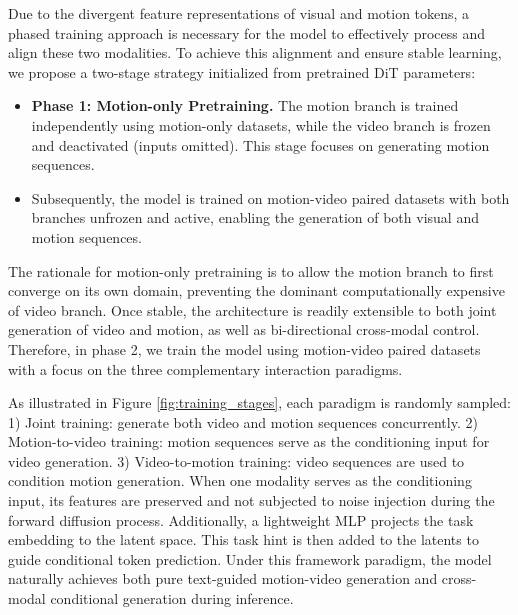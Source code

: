 Due to the divergent feature representations of visual and motion tokens, a phased training approach is necessary for the model to effectively process and align these two modalities. To achieve this alignment and ensure stable learning, we propose a two-stage strategy initialized from pretrained DiT parameters:
\begin{itemize}
\item \textbf{Phase 1: Motion-only Pretraining.} The motion branch is trained independently using motion-only datasets, while the video branch is frozen and deactivated (inputs omitted). This stage focuses on generating motion sequences.
\item \textbf{} Subsequently, the model is trained on motion-video paired datasets with both branches unfrozen and active, enabling the generation of both visual and motion sequences.
\end{itemize}
The rationale for motion-only pretraining is to allow the motion branch to first converge on its own domain, preventing the dominant computationally expensive of video branch. 
Once stable, the architecture is readily extensible to both joint generation of video and motion, as well as bi-directional cross-modal control. Therefore, in phase 2, we train the model using motion-video paired datasets with a focus on the three complementary interaction paradigms. 


As illustrated in Figure \ref{fig:training_stages}, each paradigm is randomly sampled: 1) Joint training: generate both video and motion sequences concurrently. 2) Motion-to-video training: motion sequences serve as the conditioning input for video generation. 3) Video-to-motion training: video sequences are used to condition motion generation. When one modality serves as the conditioning input, its features are preserved and not subjected to noise injection during the forward diffusion process. Additionally, a lightweight MLP projects the task embedding to the latent space. This task hint is then added to the latents to guide conditional token prediction. 
Under this framework paradigm, the model naturally achieves both pure text-guided motion-video generation and cross-modal conditional generation during inference. 

